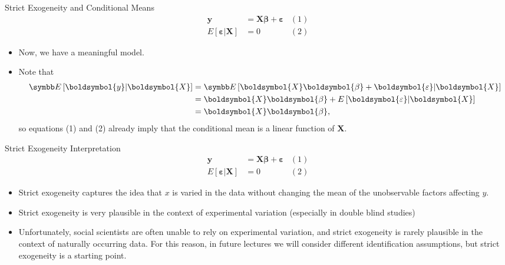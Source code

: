 \documentclass[aspectratio=169,11pt]{beamer}
\begin{document}
\begin{frame}{Strict Exogeneity and Conditional Means}
\begin{align*}
\boldsymbol{y} & =  \boldsymbol{X}\boldsymbol{\beta}+\boldsymbol{\varepsilon}	& (1)\\
E\left[\boldsymbol{\varepsilon}|\boldsymbol{X}\right] & =  0						& (2)
\end{align*}
\begin{itemize}
	\item Now, we have a meaningful model. 
	\item Note that
\begin{align*}
\E\left[\boldsymbol{y}|\boldsymbol{X}\right] & =  \E\left[\boldsymbol{X}\boldsymbol{\beta}+\boldsymbol{\varepsilon}|\boldsymbol{X}\right]\\
 & =  \boldsymbol{X}\boldsymbol{\beta}+E\left[\boldsymbol{\varepsilon}|\boldsymbol{X}\right]\\
 &  = \boldsymbol{X}\boldsymbol{\beta},
\end{align*}
so equations (1) and (2) already imply that the conditional mean is a linear function of $\boldsymbol{X}$.
\end{itemize}
\end{frame}

\begin{frame}{Strict Exogeneity Interpretation}
\begin{align*}
\boldsymbol{y} & =  \boldsymbol{X}\boldsymbol{\beta}+\boldsymbol{\varepsilon}	& (1)\\
E\left[\boldsymbol{\varepsilon}|\boldsymbol{X}\right] & =  0						& (2)
\end{align*}
\begin{itemize}
	\item Strict exogeneity captures the idea that $x$ is varied in the data without changing the mean
	of the unobservable factors affecting $y$. 

	\medskip
	\item Strict exogeneity is very plausible in the context of experimental variation (especially in double blind studies) 

	\medskip
	\item Unfortunately, social scientists are often unable to rely on experimental variation, and strict exogeneity 
	is rarely plausible in the context of naturally occurring data. For this reason, in future lectures we will consider
	different identification assumptions, but strict exogeneity is a starting point.
\end{itemize}
\end{frame}
\end{document}
